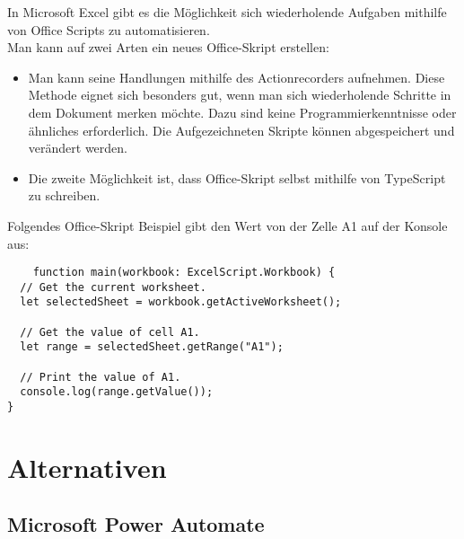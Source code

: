 In Microsoft Excel gibt es die Möglichkeit sich wiederholende Aufgaben mithilfe 
von Office Scripts zu automatisieren.
\\
Man kann auf zwei Arten ein neues Office-Skript erstellen:
\begin{itemize}
    \item Man kann seine Handlungen mithilfe des Actionrecorders aufnehmen. 
    Diese Methode eignet sich besonders gut, wenn man sich wiederholende 
    Schritte in dem Dokument merken möchte. Dazu sind keine Programmierkenntnisse 
    oder ähnliches erforderlich. Die Aufgezeichneten Skripte können 
    abgespeichert und verändert werden.
    \item Die zweite Möglichkeit ist, dass Office-Skript selbst mithilfe 
    von TypeScript zu schreiben.
\end{itemize}

Folgendes Office-Skript Beispiel gibt den Wert von der Zelle A1 auf der Konsole aus:

\begin{lstlisting}
    function main(workbook: ExcelScript.Workbook) {
  // Get the current worksheet.
  let selectedSheet = workbook.getActiveWorksheet();

  // Get the value of cell A1.
  let range = selectedSheet.getRange("A1");
  
  // Print the value of A1.
  console.log(range.getValue());
}
\end{lstlisting}

\newpage

\section{Alternativen}

\subsection*{Microsoft Power Automate}